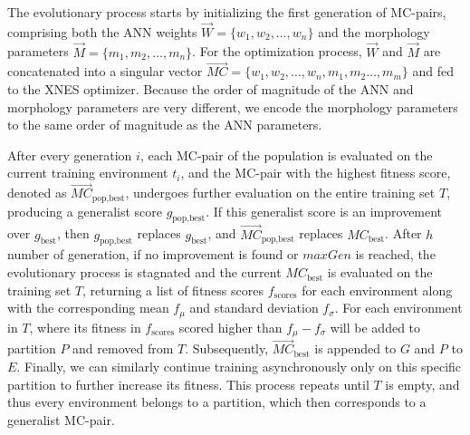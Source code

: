         The evolutionary process starts by initializing the first generation of MC-pairs, comprising both the ANN weights $\overrightarrow{W} = \{w_1, w_2, \ldots, w_n\}$ and the morphology parameters $\overrightarrow{M} = \{m_1, m_2, \ldots, m_n\}$. For the optimization process, $\overrightarrow{W}$ and $\overrightarrow{M}$ are concatenated into a singular vector \newline $\overrightarrow{MC} = \{w_1, w_2, \ldots, w_n, m_1, m_2 \ldots, m_m\}$ and fed to the XNES optimizer. Because the order of magnitude of the ANN and morphology parameters are very different, we encode the morphology parameters to the same order of magnitude as the ANN parameters.

        After every generation $i$, each MC-pair of the population is evaluated on the current training environment $t_i$, and the MC-pair with the highest fitness score, denoted as $\overrightarrow{MC}_{\text{pop,best}}$, undergoes further evaluation on the entire training set $T$, producing a generalist score $g_{\text{pop,best}}$. If this generalist score is an improvement over $g_{\text{best}}$, then $g_{\text{pop,best}}$ replaces $g_{\text{best}}$, and $\overrightarrow{MC}_{\text{pop,best}}$ replaces $MC_{\text{best}}$. After $h$ number of generation, if no improvement is found or $maxGen$ is reached, the evolutionary process is stagnated and the current $MC_{\text{best}}$ is evaluated on the training set $T$, returning a list of fitness scores $f_{\text{scores}}$ for each environment along with the corresponding mean $f_{\mu}$ and standard deviation $f_{\sigma}$. For each environment in $T$, where its fitness in $f_{\text{scores}}$ scored higher than $f_{\mu} - f_{\sigma}$ will be added to partition $P$ and removed from $T$. Subsequently, $\overrightarrow{MC}_{\text{best}}$ is appended to $G$ and $P$ to $E$. Finally, we can similarly continue training asynchronously only on this specific partition to further increase its fitness. This process repeats until $T$ is empty, and thus every environment belongs to a partition, which then corresponds to a generalist MC-pair. 

